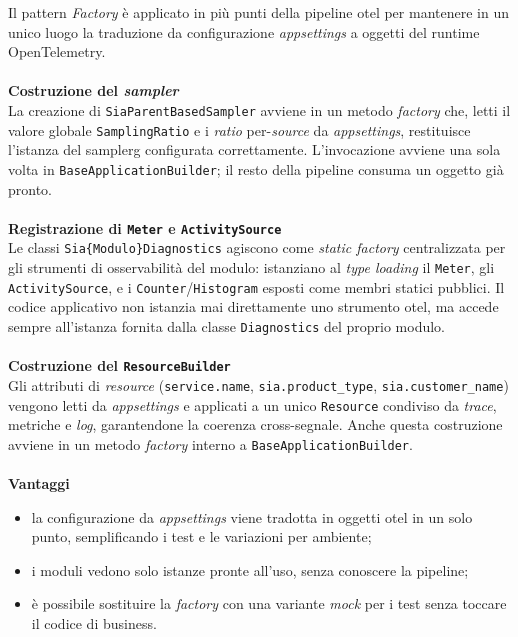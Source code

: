 Il pattern \emph{Factory} è applicato in più punti della pipeline \gls{otel} per mantenere in un
unico luogo la traduzione da configurazione \emph{appsettings} a oggetti del runtime
OpenTelemetry.\\
\\\textbf{Costruzione del \emph{sampler}}\\
La creazione di \texttt{SiaParentBasedSampler}
avviene in un metodo \emph{factory} che, letti il valore globale \texttt{SamplingRatio} e i
\emph{ratio} per-\emph{source} da \emph{appsettings}, restituisce l'istanza del \gls{samplerg}
configurata correttamente. L'invocazione avviene una sola volta in
\texttt{BaseApplicationBuilder}; il resto della pipeline consuma un oggetto già pronto.\\
\\\textbf{Registrazione di \texttt{Meter} e \texttt{ActivitySource}}\\
Le classi
\texttt{Sia\{Modulo\}Diagnostics} agiscono come \emph{static factory} centralizzata per gli
strumenti di osservabilità del modulo: istanziano al \emph{type loading} il \texttt{Meter}, gli
\texttt{ActivitySource}, e i \texttt{Counter}/\texttt{Histogram} esposti come membri statici
pubblici. Il codice applicativo non istanzia mai direttamente uno strumento \gls{otel}, ma accede
sempre all'istanza fornita dalla classe \texttt{Diagnostics} del proprio modulo.\\
\\\textbf{Costruzione del \texttt{ResourceBuilder}}\\
Gli attributi di \emph{resource}
(\texttt{service.name}, \texttt{sia.product\_type}, \texttt{sia.customer\_name}) vengono letti
da \emph{appsettings} e applicati a un unico \texttt{Resource} condiviso da \emph{trace},
metriche e \emph{log}, garantendone la coerenza cross-segnale. Anche questa costruzione avviene
in un metodo \emph{factory} interno a \texttt{BaseApplicationBuilder}.\\
\\\textbf{Vantaggi}
\begin{itemize}
      \item la configurazione da \emph{appsettings} viene tradotta in oggetti \gls{otel} in un solo
            punto, semplificando i test e le variazioni per ambiente;
      \item i moduli vedono solo istanze pronte all'uso, senza conoscere la pipeline;
      \item è possibile sostituire la \emph{factory} con una variante \emph{mock} per i test
            senza toccare il codice di business.
\end{itemize}

